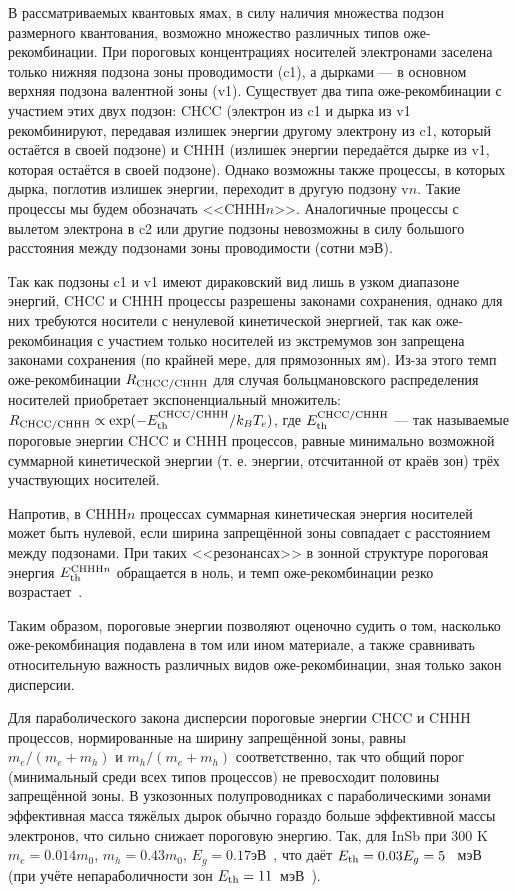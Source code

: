 В рассматриваемых квантовых ямах, в силу наличия множества подзон размерного квантования, возможно множество различных типов оже-рекомбинации. При пороговых концентрациях носителей электронами заселена только нижняя подзона зоны проводимости (c1), а дырками --- в основном верхняя подзона валентной зоны (v1). Существует два типа оже-рекомбинации с участием этих двух подзон: CHCC (электрон из c1 и дырка из v1 рекомбинируют, передавая излишек энергии другому электрону из c1, который остаётся в своей подзоне) и CHHH (излишек энергии передаётся дырке из v1, которая остаётся в своей подзоне). Однако возможны также процессы, в которых дырка, поглотив излишек энергии, переходит в другую подзону v$n$. Такие процессы мы будем обозначать <<CHHH$n$>>. Аналогичные процессы с вылетом электрона в c2 или другие подзоны невозможны в силу большого расстояния между подзонами зоны проводимости (сотни мэВ).

Так как подзоны c1 и v1 имеют дираковский вид лишь в узком диапазоне энергий, CHCC и CHHH процессы разрешены законами сохранения, однако для них требуются носители с ненулевой кинетической энергией, так как оже-рекомбинация с участием только носителей из экстремумов зон запрещена законами сохранения (по крайней мере, для прямозонных ям). Из-за этого темп оже-рекомбинации $R_{\rm CHCC/CHHH}$ для случая больцмановского распределения носителей приобретает экспоненциальный множитель: $R_{\rm CHCC/CHHH} \propto \exp(-E^{\rm CHCC/CHHH}_{\rm th}/k_B T_e)$, где $E^{\rm CHCC/CHHH}_{\rm th}$ --- так называемые пороговые энергии CHCC и CHHH процессов, равные минимально возможной суммарной кинетической энергии (т. е. энергии, отсчитанной от краёв зон) трёх участвующих носителей. 

Напротив, в CHHH$n$ процессах суммарная кинетическая энергия носителей может быть нулевой, если ширина запрещённой зоны совпадает с расстоянием между подзонами. При таких <<резонансах>> в зонной структуре пороговая энергия $E^{{\rm CHHH}n}_{\rm th}$ обращается в ноль, и темп оже-рекомбинации резко возрастает~\cite{resonant_Auger}.

Таким образом, пороговые энергии позволяют оценочно судить о том, насколько оже-рекомбинация подавлена в том или ином материале, а также сравнивать относительную важность различных видов оже-рекомбинации, зная только закон дисперсии.

Для параболического закона дисперсии пороговые энергии CHCC и CHHH процессов, нормированные на ширину запрещённой зоны, равны $m_e/(m_e + m_h)$ и $m_h/(m_e + m_h)$  соответственно, так что общий порог (минимальный среди всех типов процессов) не превосходит половины запрещённой зоны. В узкозонных полупроводниках с параболическими зонами эффективная масса тяжёлых дырок обычно гораздо больше эффективной массы электронов, что сильно снижает пороговую энергию. Так, для InSb при 300 K $m_e = 0.014 m_0$, $m_h = 0.43 m_0$, $E_g = 0.17 эВ$~\cite{semiconductor_handbook}, что даёт $E_{\rm th} = 0.03 E_g = 5$~ мэВ (при учёте непараболичности зон $E_{\rm th} = 11$~мэВ~\cite{InSb_threshold}).

